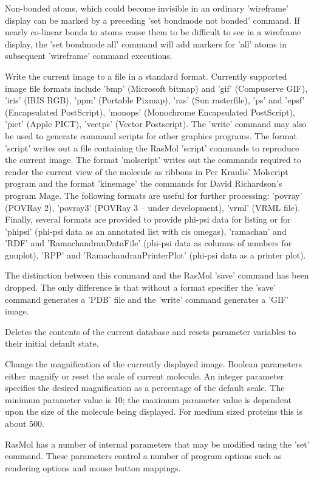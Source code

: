 Non-bonded atoms, which could become invisible in an
ordinary
'wireframe'
display can be marked by a preceding
'set bondmode not bonded'
command.  If nearly co-linear bonds to atoms cause them to be
difficult to see in a wireframe display, the
'set bondmode all'
command will add markers for
'all'
atoms in subsequent
'wireframe'
command executions.

Write the current image to a file in a standard format. Currently
supported image file formats include
'bmp'
(Microsoft bitmap) and
'gif'
(Compuserve GIF),
'iris'
(IRIS RGB),
'ppm'
(Portable Pixmap),
'ras'
(Sun rasterfile),
'ps'
and
'epsf'
(Encapsulated PostScript),
'monops'
(Monochrome Encapsulated PostScript),
'pict'
(Apple PICT),
'vectps'
(Vector Postscript).  The
'write'
command may also be used to generate command scripts for other graphics
programs. The format
'script'
writes out a file containing the RasMol
'script'
commands to reproduce the current image. The format
'molscript'
writes out the commands required to render the current view of the
molecule as ribbons in Per Kraulis' Molscript program and the format
'kinemage'
the commands for David Richardson's program Mage.  The following
formats are useful for further processing:
'povray'
(POVRay 2),
'povray3'
(POVRay 3 -- under development),
'vrml'
(VRML file).
Finally, several
formats are provided to provide phi-psi data for listing or for
'phipsi'
(phi-psi data as an annotated list with cis omegas),
'ramachan'
and
'RDF'
and
'RamachandranDataFile'
(phi-psi data as columns of numbers for gnuplot),
'RPP'
and
'RamachandranPrinterPlot'
(phi-psi data as a printer plot).

The distinction between this command and the RasMol
'save'
command has been dropped. The only difference is that without a format
specifier the
'save'
command generates a
'PDB'
file and the
'write'
command generates a
'GIF'
image.

Deletes the contents of the current database and resets parameter
variables to their initial default state.

Change the magnification of the currently displayed image. Boolean
parameters either magnify or reset the scale of current molecule. An
integer parameter specifies the desired magnification as a percentage
of the default scale. The minimum parameter value is 10; the maximum
parameter value is dependent upon the size of the molecule being
displayed. For medium sized proteins this is about 500.

RasMol has a number of internal parameters that may be modified using the
'set'
command. These parameters control a number of program options such as
rendering options and mouse button mappings.

